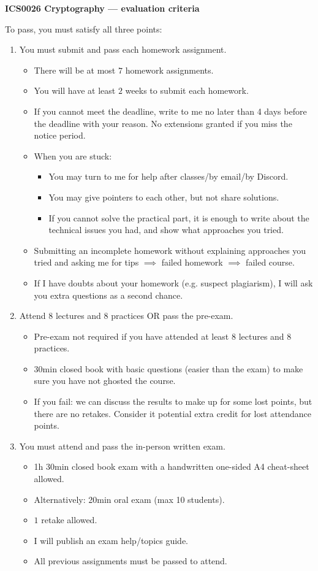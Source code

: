 \documentclass[usegeometry,parskip=half]{scrartcl}
\begin{document}
\textbf{ICS0026 Cryptography --- evaluation criteria}

To pass, you must satisfy all three points:
\begin{enumerate}
  \item You must submit and pass each homework assignment.
  \begin{itemize}
    \item There will be at most $7$ homework assignments.
    \item You will have at least $2$ weeks to submit each homework.
    \item If you cannot meet the deadline, write to me no later than 4 days before the deadline with your reason.
    No extensions granted if you miss the notice period.
    \item When you are stuck:
    \begin{itemize}
      \item You may turn to me for help after classes/by email/by Discord.
      \item You may give pointers to each other, but not share solutions.
      \item If you cannot solve the practical part, it is enough to write about the technical issues you had, and show what approaches you tried.
    \end{itemize}
    \item Submitting an incomplete homework without explaining approaches you tried and asking me for tips $\implies$ failed homework $\implies$ failed course.
    \item If I have doubts about your homework (e.g. suspect plagiarism), I will ask you extra questions as a second chance.
  \end{itemize}
  \item Attend 8 lectures and 8 practices OR pass the pre-exam.
  \begin{itemize}
    \item Pre-exam not required if you have attended at least 8 lectures and 8 practices.
    \item 30min closed book with basic questions (easier than the exam) to make sure you have not ghosted the course.
    \item If you fail: we can discuss the results to make up for some lost points, but there are no retakes.
    Consider it potential extra credit for lost attendance points.
  \end{itemize}
  \item You must attend and pass the in-person written exam.
  \begin{itemize}
    \item 1h 30min closed book exam with a handwritten one-sided A4 cheat-sheet allowed.
    \item Alternatively: 20min oral exam (max 10 students).
    \item $1$ retake allowed.
    \item I will publish an exam help/topics guide.
    \item All previous assignments must be passed to attend.
  \end{itemize}
\end{enumerate}
\end{document}
